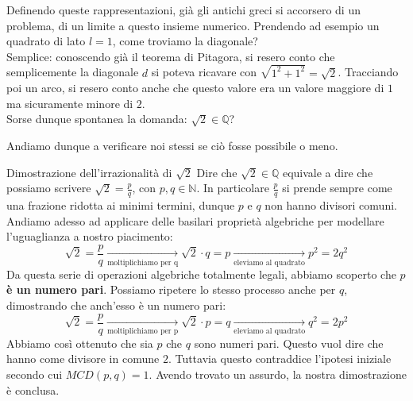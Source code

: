 \documentclass[12pt]{report}
\newcommand{\N}{\mathbb{N}}
\newcommand{\Q}{\mathbb{Q}}
\begin{document}
	Definendo queste rappresentazioni, già gli antichi greci si accorsero di un problema, di un limite a questo insieme numerico. Prendendo ad esempio un quadrato di lato $l = 1$, come troviamo la diagonale?\\
	Semplice: conoscendo già il teorema di Pitagora, si resero conto che semplicemente la diagonale $d$ si poteva ricavare con $\sqrt{1^2 + 1^2} = \sqrt{2}$. Tracciando poi un arco, si resero conto anche che questo valore era un valore maggiore di $1$ ma sicuramente minore di $2$.\\
	Sorse dunque spontanea la domanda: $\sqrt{2} \in \Q$?
	
	Andiamo dunque a verificare noi stessi se ciò fosse possibile o meno.
	\begin{dimostrazione}{Dimostrazione dell'irrazionalità di $\sqrt{2}$}{}
		Dire che $\sqrt{2} \in \Q$ equivale a dire che possiamo scrivere $\sqrt{2} = \frac{p}{q}$, con $p, q \in \N$. In particolare $\frac{p}{q}$ si prende sempre come una frazione ridotta ai minimi termini, dunque $p$ e $q$ non hanno divisori comuni.
		Andiamo adesso ad applicare delle basilari proprietà algebriche per modellare l'uguaglianza a nostro piacimento:
		\[
			\sqrt{2} = \frac{p}{q} \xrightarrow[\text{moltiplichiamo per q}]{} \sqrt{2}\cdot q = p \xrightarrow[\text{eleviamo al quadrato}]{} p^2 = 2q^2
		\]
		Da questa serie di operazioni algebriche totalmente legali, abbiamo scoperto che $p$ \textbf{è un numero pari}.
		Possiamo ripetere lo stesso processo anche per $q$, dimostrando che anch'esso è un numero pari:
		\[
			\sqrt{2} = \frac{p}{q} \xrightarrow[\text{moltiplichiamo per p}]{} \sqrt{2}\cdot p = q \xrightarrow[\text{eleviamo al quadrato}]{} q^2 = 2p^2
		\]
		Abbiamo così ottenuto che sia $p$ che $q$ sono numeri pari. Questo vuol dire che hanno come divisore in comune $2$. Tuttavia questo contraddice l'ipotesi iniziale secondo cui $MCD(p, q) = 1$. Avendo trovato un assurdo, la nostra dimostrazione è conclusa.
		
	\end{dimostrazione}
	
\end{document}

